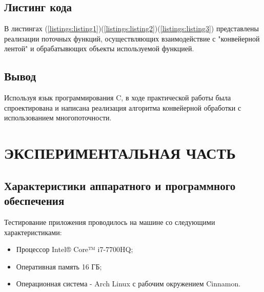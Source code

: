 \documentclass[a4paper,12pt]{article}
\begin{document}
\subsection{Листинг кода}
В листингах (\ref{listings:listing1})(\ref{listings:listing2})(\ref{listings:listing3}) представлены реализации поточных функций, осуществляющих взаимодействие с "конвейерной лентой" и обрабатывющих объекты используемой функцией.

\newpage

\newpage


\newpage
\subsection{Вывод}
Используя язык программирования C, в ходе практической работы была спроектирована и написана реализация алгоритма конвейерной обработки с использованием многопоточности.

\newpage
\section{ЭКСПЕРИМЕНТАЛЬНАЯ ЧАСТЬ}
\subsection{Характеристики аппаратного и программного обеспечения}
Тестирование приложения проводилось на машине со следующими характеристиками:\\
\begin{itemize}
\item Процессор Intel® Core™ i7-7700HQ;
\item Оперативная память 16 ГБ;
\item Операционная система - Arch Linux с рабочим окружением Cinnamon.
\end{itemize}

\newpage
\end{document}
